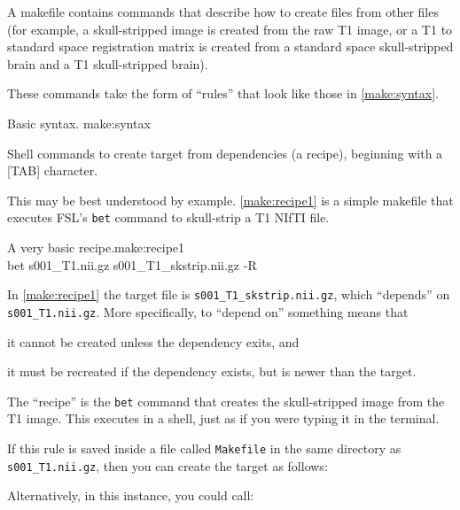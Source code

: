 A makefile contains commands that describe how to create files from other files (for example, a skull-stripped image is created from the raw T1 image, or a T1 to standard space registration matrix is created from a standard space skull-stripped brain and a T1 skull-stripped brain).
	
These commands take the form of ``rules'' that look like those in \autoref{make:syntax}.
	
\begin{make}{Basic \maken{} syntax. }{make:syntax}
	 \\
	\tab \begin{minipage}[t]{\linewidth-4em} {\color{gray} Shell commands to create target from dependencies (a recipe), beginning with a [TAB] character.} \end{minipage}
\end{make}
	
This may be best understood by example. \autoref{make:recipe1} is a simple makefile that executes FSL's \texttt{bet} command to skull-strip a T1 NIfTI file.
	
\begin{make}{A very basic \maken{} recipe.}{make:recipe1}
	 \\
	\tab bet s001_T1.nii.gz s001_T1_skstrip.nii.gz -R
\end{make}
	
In \autoref{make:recipe1} the target file is \texttt{s001_T1_skstrip.nii.gz}, which ``depends'' on \texttt{s001_T1.nii.gz}. More specifically, to ``depend on'' something means that \begin{inparaenum} \item it cannot be created unless the dependency exits, and \item it must be recreated if the dependency exists, but is newer than the target. \end{inparaenum}
	
The ``recipe'' is the \texttt{bet} command that creates the skull-stripped image from the T1 image. This executes in a shell, just as if you were typing it in the terminal.
	
If this rule is saved inside a file called \texttt{Makefile} in the same directory as \texttt{s001_T1.nii.gz}, then you can create the target as follows:	
	
Alternatively, in this instance, you could call:
	

